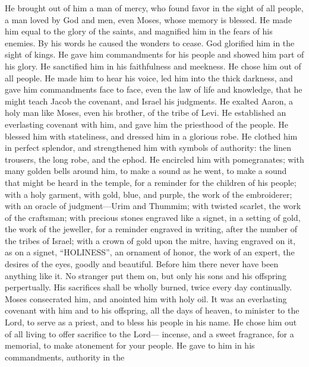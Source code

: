  He brought out of him a man of mercy, who found favor in
the sight of all people, a man loved by God and men, even Moses, whose
memory is blessed.  He made him equal to the glory of the
saints, and magnified him in the fears of his enemies.  By
his words he caused the wonders to cease. God glorified him in the sight
of kings. He gave him commandments for his people and showed him part of
his glory.  He sanctified him in his faithfulness and
meekness. He chose him out of all people.  He made him to
hear his voice, led him into the thick darkness, and gave him
commandments face to face, even the law of life and knowledge, that he
might teach Jacob the covenant, and Israel his judgments. 
He exalted Aaron, a holy man like Moses, even his brother, of the tribe
of Levi.  He established an everlasting covenant with him,
and gave him the priesthood of the people. He blessed him with
stateliness, and dressed him in a glorious robe.  He clothed
him in perfect splendor, and strengthened him with symbols of authority:
the linen trousers, the long robe, and the ephod.  He
encircled him with pomegranates; with many golden bells around him, to
make a sound as he went, to make a sound that might be heard in the
temple, for a reminder for the children of his people; 
with a holy garment, with gold, blue, and purple, the work of the
embroiderer; with an oracle of judgment---Urim and Thummim;
 with twisted scarlet, the work of the craftsman; with
precious stones engraved like a signet, in a setting of gold, the work
of the jeweller, for a reminder engraved in writing, after the number of
the tribes of Israel;  with a crown of gold upon the mitre,
having engraved on it, as on a signet, ``HOLINESS'', an ornament of
honor, the work of an expert, the desires of the eyes, goodly and
beautiful.  Before him there never have been anything like
it. No stranger put them on, but only his sons and his offspring
perpertually.  His sacrifices shall be wholly burned, twice
every day continually.  Moses consecrated him, and anointed
him with holy oil. It was an everlasting covenant with him and to his
offspring, all the days of heaven, to minister to the Lord, to serve as
a priest, and to bless his people in his name.  He chose
him out of all living to offer sacrifice to the Lord--- incense, and a
sweet fragrance, for a memorial, to make atonement for your people.
 He gave to him in his commandments, authority in the
